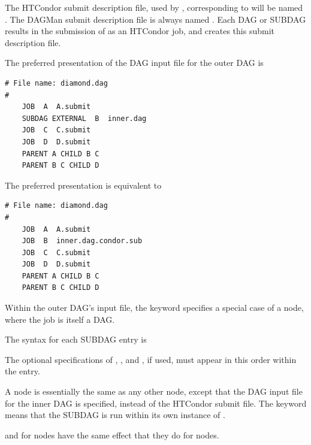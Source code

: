 The HTCondor submit description file, used by ,
corresponding to  will be named
.  The DAGMan submit description file is always
named .
Each DAG or SUBDAG results in the submission of 
as an HTCondor job, and  creates this
submit description file.

The preferred presentation of the DAG input file for the outer DAG is
\begin{verbatim}
# File name: diamond.dag
#
    JOB  A  A.submit 
    SUBDAG EXTERNAL  B  inner.dag
    JOB  C  C.submit	
    JOB  D  D.submit
    PARENT A CHILD B C
    PARENT B C CHILD D
\end{verbatim}

The preferred presentation is equivalent to
\begin{verbatim}
# File name: diamond.dag
#
    JOB  A  A.submit 
    JOB  B  inner.dag.condor.sub
    JOB  C  C.submit	
    JOB  D  D.submit
    PARENT A CHILD B C
    PARENT B C CHILD D
\end{verbatim}

Within the outer DAG's input file,
the  keyword specifies a special case of a 
node, where the job is itself a DAG.

The syntax for each SUBDAG entry is

   
  

The optional specifications of , , and ,
if used, must appear in this order within the entry.

A  node is essentially the same as any other node,
except that the DAG input file for the inner DAG is specified,
instead of the HTCondor submit file.
The keyword  means that the
SUBDAG is run within its own instance of .

 and  for  nodes have the same effect
that they do for  nodes.

